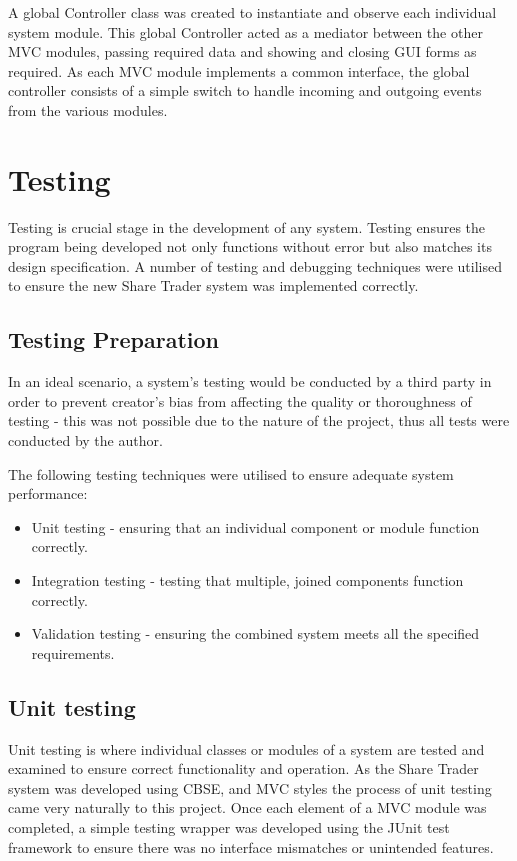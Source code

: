 \documentclass[12pt, a4paper,titlepage]{article}
\begin{document}
A global Controller class was created to instantiate and observe each
individual system module. 
This global Controller acted as a mediator between the other MVC modules,
passing required data and showing and closing GUI forms as required.  
As each MVC module implements a common interface, the global controller
consists of a simple switch to handle incoming and outgoing events from the
various modules.


\section{Testing}
Testing is crucial stage in the development of any system.
Testing ensures the program being developed not only functions without error
but also matches its design specification. 
A number of testing and debugging techniques were utilised to ensure the new
Share Trader system was implemented correctly.

\subsection{Testing Preparation}
In an ideal scenario, a system’s testing would be conducted by a third party
in order to prevent creator's bias from affecting the quality or thoroughness
of testing - this was not possible due to the nature of the project, thus all
tests were conducted by the author.

The following testing techniques were utilised to ensure adequate system
performance:
\begin{itemize}
    \item Unit testing - ensuring that an individual component or module
    function correctly.
    \item Integration testing - testing that multiple, joined components
    function correctly.
    \item Validation testing - ensuring the combined system meets all the
    specified requirements.
\end{itemize}

\subsection{Unit testing}
Unit testing is where individual classes or modules of a system are tested and
examined to ensure correct functionality and operation. 
As the Share Trader system was developed using CBSE, and MVC styles the
process of unit testing came very naturally to this project.  
Once each element of a MVC module was completed, a simple testing wrapper was
developed  using the JUnit test framework to ensure there was no interface
mismatches or unintended features.
\end{document}
